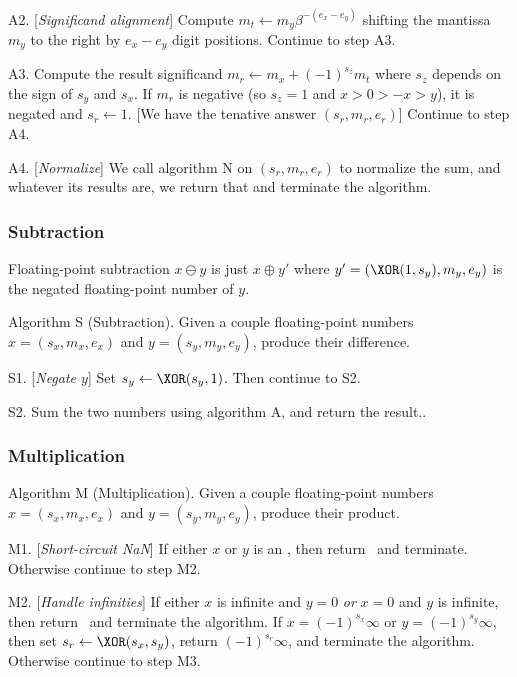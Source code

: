 \algstep A2. [{\it Significand alignment\/}] Compute $m_{t}\gets m_{y}\beta^{-(e_{x}-e_{y})}$
shifting the mantissa $m_{y}$ to the right by $e_{x}-e_{y}$ digit
positions. Continue to step A3.

\algstep A3. Compute the result significand $m_{r}\gets m_{x} + (-1)^{s_{z}}m_{t}$
where $s_{z}$ depends on the sign of $s_{y}$ and $s_{x}$. If $m_{r}$
is negative (so $s_{z}=1$ and $x>0>-x>y$), it is negated and $s_{r}\gets 1$.
[We have the tenative answer $(s_{r}, m_{r}, e_{r})$] Continue to step A4.

\algstep A4. [{\it Normalize\/}] We call algorithm N on $(s_{r}, m_{r}, e_{r})$
to normalize the sum, and whatever its results are, we return that and
terminate the algorithm.\quad\slug


\subsubsection{Subtraction}

\begin{rmk}[Subtraction]
  Floating-point subtraction $x\ominus y$ is just $x\oplus y'$ where
  $y' = (\XOR(1,s_{y}),m_{y},e_{y})$ is the negated floating-point
  number of $y$.
\end{rmk}

\algbegin Algorithm S (Subtraction). \label{alg:float-subtraction}Given a couple floating-point
numbers $x=(s_{x},m_{x},e_{x})$ and $y=(s_{y}, m_{y}, e_{y})$, produce
their difference.

\algstep S1. [{\it Negate $y$\/}] Set $s_{y}\gets\XOR(s_{y},1)$. Then
continue to S2.

\algstep S2. Sum the two numbers using algorithm A, and return the result.\quad\slug.

\subsubsection{Multiplication}

\algbegin Algorithm M (Multiplication). \label{alg:float-multiplication}Given a couple floating-point
numbers $x=(s_{x},m_{x},e_{x})$ and $y=(s_{y}, m_{y}, e_{y})$, produce
their product.

\algstep M1. [{\it Short-circuit NaN\/}] If either $x$ or $y$ is an
\NaN, then return \qNaN\ and terminate. Otherwise continue to step M2.

\algstep M2. [{\it Handle infinities\/}] If either $x$ is infinite and
$y=0$ \emph{or} $x=0$ and $y$ is infinite, then return \qNaN\ and
terminate the algorithm.
If $x=(-1)^{s_{x}}\infty$ or $y=(-1)^{s_{y}}\infty$, then set
$s_{r}\gets\XOR(s_{x},s_{y})$, return $(-1)^{s_{r}}\infty$, and
terminate the algorithm.
Otherwise continue to step M3.

